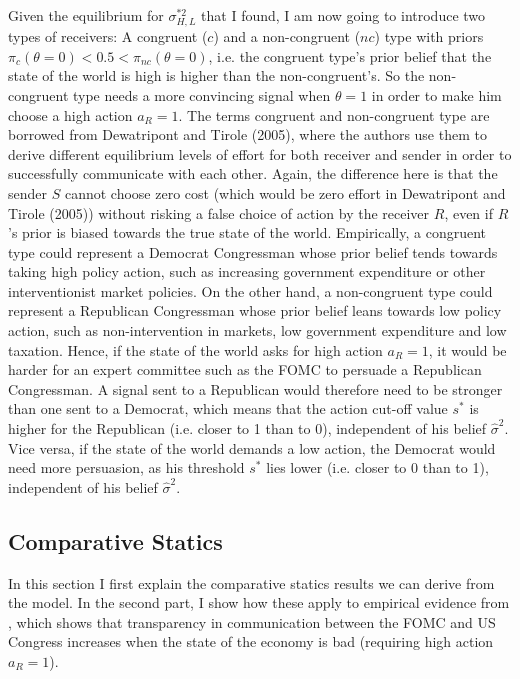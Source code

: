 \documentclass[paper=a4,12pt,DIV=11,twoside=false]{scrartcl}
\begin{document}
\noindent Given the equilibrium for $\sigma^{*2}_{H,L}$ that I found, I am now going to introduce two types of receivers: A congruent ($c$) and a non-congruent ($nc$) type with priors $\pi_{c}(\theta=0) < 0.5 < \pi_{nc}(\theta=0)$, i.e. the congruent type's prior belief that the state of the world is high is higher than the non-congruent's. So the non-congruent type needs a more convincing signal when $\theta=1$ in order to make him choose a high action $a_R =1$. The terms congruent and non-congruent type are borrowed from Dewatripont and Tirole (2005), where the authors use them to derive different equilibrium levels of effort for both receiver and sender in order to successfully communicate with each other. Again, the difference here is that the sender $S$ cannot choose zero cost (which would be zero effort in Dewatripont and Tirole (2005)) without risking a false choice of action by the receiver $R$, even if $R$'s prior is biased towards the true state of the world. Empirically, a congruent type could represent a Democrat Congressman  whose prior belief tends towards taking high policy action, such as increasing government expenditure or other interventionist market policies. On the other hand, a non-congruent type could represent a Republican Congressman whose prior belief leans towards low policy action, such as non-intervention in markets, low government expenditure and low taxation. Hence, if the state of the world asks for high action $a_{R}=1$, it would be harder for an expert committee such as the FOMC to persuade a Republican Congressman. A signal sent to a Republican would therefore need to be stronger than one sent to a Democrat, which means that the action cut-off value $s^{*}$ is higher for the Republican (i.e. closer to 1 than to 0), independent of his belief $\hat{\sigma}^2$. Vice versa, if the state of the world demands a low action, the Democrat would need more persuasion, as his threshold $s^{*}$ lies lower (i.e. closer to 0 than to 1), independent of his belief $\hat{\sigma}^2$. 

\subsection{Comparative Statics}

\noindent In this section I first explain the comparative statics results we can derive from the model. In the second part, I show how these apply to empirical evidence from \citet{GL2017}, which shows that transparency in communication between the FOMC and US Congress increases when the state of the economy is bad (requiring high action $a_{R}=1$).
\end{document}
